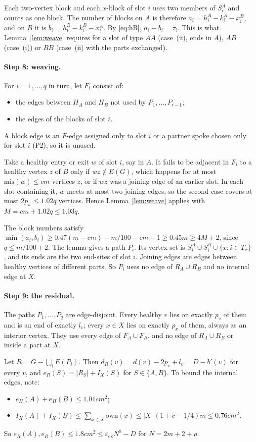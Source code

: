 \documentclass[11pt]{article}
\theoremstyle{definition}
\newcommand{\eps}{\varepsilon}
\newcommand{\epsex}{\eps_{\mathrm{ex}}}
\newcommand{\own}{\mathrm{own}}
\newcommand{\mis}{\mathrm{mis}}
\begin{document}
Each two-vertex block and each $x$-block of slot $i$ uses two members of $S^A_i$ and counts as one block. The number of blocks on $A$ is therefore $a_i=h^A_i-k^A_i-x^B_i$, and on $B$ it is $b_i=h^B_i-k^B_i-x^A_i$. By \eqref{eq:hB}, $a_i-b_i=\tau_i$. This is what Lemma~\ref{lem:weave} requires for a slot of type $AA$ (case~(ii), ends in $A$), $AB$ (case~(i)) or $BB$ (case~(ii) with the parts exchanged).

\paragraph{Step 8: weaving.} For $i=1,\dots,q$ in turn, let $F_i$ consist of:
\begin{itemize}[nosep]
\item the edges between $H_A$ and $H_B$ not used by $P_1,\dots,P_{i-1}$;
\item the edges of the blocks of slot $i$.
\end{itemize}
A block edge is an $F$-edge assigned only to slot $i$ or a partner spoke chosen only for slot $i$ (P2), so it is unused.

Take a healthy entry or exit $w$ of slot $i$, say in $A$. It fails to be adjacent in $F_i$ to a healthy vertex $z$ of $B$ only if $wz\notin E(G)$, which happens for at most $\mis(w)\le cm$ vertices $z$, or if $wz$ was a joining edge of an earlier slot. In each slot containing it, $w$ meets at most two joining edges, so the second case covers at most $2p_w\le1.02q$ vertices. Hence Lemma~\ref{lem:weave} applies with $M=cm+1.02q\le1.03q$.

The block numbers satisfy $\min(a_i,b_i)\ge0.47(m-cm)-m/100-cm-1\ge0.45m\ge4M+2$, since $q\le m/100+2$. The lemma gives a path $P_i$. Its vertex set is $S^A_i\cup S^B_i\cup\{x:i\in T_x\}$, and its ends are the two end-sites of slot $i$. Joining edges are edges between healthy vertices of different parts. So $P_i$ uses no edge of $R_A\cup R_B$ and no internal edge at $X$.

\paragraph{Step 9: the residual.} The paths $P_1,\dots,P_q$ are edge-disjoint. Every healthy $v$ lies on exactly $p_v$ of them and is an end of exactly $l_v$; every $x\in X$ lies on exactly $p_x$ of them, always as an interior vertex. They use every edge of $F_A\cup F_B$, and no edge of $R_A\cup R_B$ or inside a part at $X$.

Let $R=G-\bigcup_iE(P_i)$. Then $d_R(v)=d(v)-2p_v+l_v=D-b'(v)$ for every $v$, and $e_R(S)=|R_S|+I_X(S)$ for $S\in\{A,B\}$. To bound the internal edges, note:
\begin{itemize}[nosep]
\item $e_H(A)+e_H(B)\le1.01cm^2$;
\item $I_X(A)+I_X(B)\le\sum_{x\in X}\own(x)\le|X|\,(1+c-1/4)m\le0.76cm^2$.
\end{itemize}
So $e_R(A),e_R(B)\le1.8cm^2\le\epsex N^2-D$ for $N=2m+2+\rho$.
\end{document}
